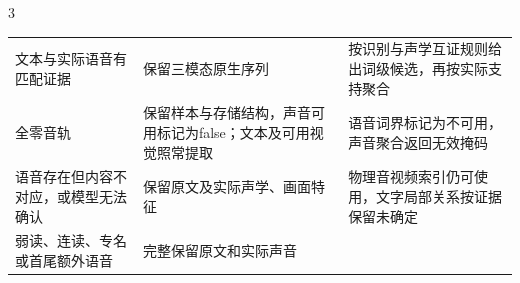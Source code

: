 \begin{PaperTable}{3}
\begin{table}[!htbp]
\begin{tabular}{@{}lll@{}}
\begin{minipage}[t]{\dimexpr 0.240000\linewidth-0.960000\tabcolsep\relax}\raggedright
文本与实际语音有匹配证据\strut
\end{minipage} & \begin{minipage}[t]{\dimexpr 0.350000\linewidth-1.400000\tabcolsep\relax}\raggedright
保留三模态原生序列\strut
\end{minipage} & \begin{minipage}[t]{\dimexpr 0.410000\linewidth-1.640000\tabcolsep\relax}\raggedright
按识别与声学互证规则给出词级候选，再按实际支持聚合\strut
\end{minipage}\tabularnewline
\begin{minipage}[t]{\dimexpr 0.240000\linewidth-0.960000\tabcolsep\relax}\raggedright
全零音轨\strut
\end{minipage} & \begin{minipage}[t]{\dimexpr 0.350000\linewidth-1.400000\tabcolsep\relax}\raggedright
保留样本与存储结构，声音可用标记为false；文本及可用视觉照常提取\strut
\end{minipage} & \begin{minipage}[t]{\dimexpr 0.410000\linewidth-1.640000\tabcolsep\relax}\raggedright
语音词界标记为不可用，声音聚合返回无效掩码\strut
\end{minipage}\tabularnewline
\begin{minipage}[t]{\dimexpr 0.240000\linewidth-0.960000\tabcolsep\relax}\raggedright
语音存在但内容不对应，或模型无法确认\strut
\end{minipage} & \begin{minipage}[t]{\dimexpr 0.350000\linewidth-1.400000\tabcolsep\relax}\raggedright
保留原文及实际声学、画面特征\strut
\end{minipage} & \begin{minipage}[t]{\dimexpr 0.410000\linewidth-1.640000\tabcolsep\relax}\raggedright
物理音视频索引仍可使用，文字局部关系按证据保留未确定\strut
\end{minipage}\tabularnewline
\begin{minipage}[t]{\dimexpr 0.240000\linewidth-0.960000\tabcolsep\relax}\raggedright
弱读、连读、专名或首尾额外语音\strut
\end{minipage} & \begin{minipage}[t]{\dimexpr 0.350000\linewidth-1.400000\tabcolsep\relax}\raggedright
完整保留原文和实际声音\strut
\end{minipage} & \begin{minipage}[t]{\dimexpr 0.410000\linewidth-1.640000\tabcolsep\relax}\raggedright

\end{minipage}
\end{tabular}
\end{table}
\end{PaperTable}
